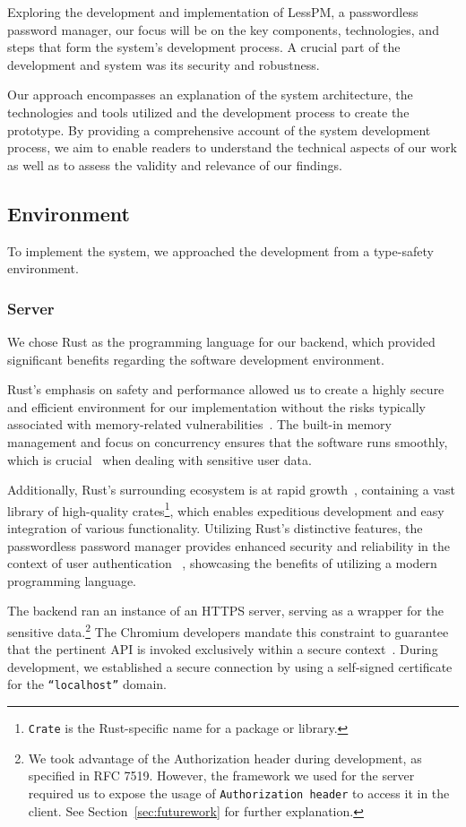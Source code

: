 Exploring the development and implementation of LessPM, a passwordless password
manager, our focus will be on the key components, technologies, and steps that
form the system's development process.
A crucial part of the development and system was its security and robustness.

Our approach encompasses an explanation of the system architecture, the
technologies and tools utilized and the development process to create the
prototype.
By providing a comprehensive account of the system development process, we aim
to enable readers to understand the technical aspects of our work as well
as to assess the validity and relevance of our findings.

\subsection{Environment}\label{subsec:environment}
To implement the system, we approached the development from a type-safety
environment.

\subsubsection{Server}
We chose Rust as the programming language for our backend, which provided
significant benefits regarding the software development environment.

Rust's emphasis on safety and performance allowed us to create a highly
secure and efficient environment for our implementation without the risks
typically associated with memory-related
vulnerabilities~\cite{rivera2019preserving}.
The built-in memory management and focus on concurrency ensures that the
software runs smoothly, which is crucial~\cite{fischer1985impossibility} when
dealing with sensitive user data.

Additionally, Rust's surrounding ecosystem is at rapid
growth~\cite{librs-stats}, containing a vast library of high-quality
crates\footnote{
  \texttt{Crate} is the Rust-specific name for a package or library.
}, which enables expeditious development and easy integration of various
functionality.
Utilizing Rust's distinctive features, the passwordless password manager
provides enhanced security and reliability in the context of user authentication
~\cite{rivera2019preserving}, showcasing the benefits of utilizing a modern
programming language.

The backend ran an instance of an HTTPS server, serving as a wrapper for the
sensitive data.\footnote{
  We took advantage of the Authorization header during development, as specified
  in RFC 7519.
  However, the framework we used for the server required us to expose the usage
  of \texttt{Authorization header} to access it in the client.
  See Section~\ref{sec:futurework} for further explanation.
}
The Chromium developers mandate this constraint to guarantee that the pertinent
API is invoked exclusively within a secure context~\cite{webdev2021credential}.
During development, we established a secure connection by using a self-signed
certificate for the \texttt{``localhost''} domain.


